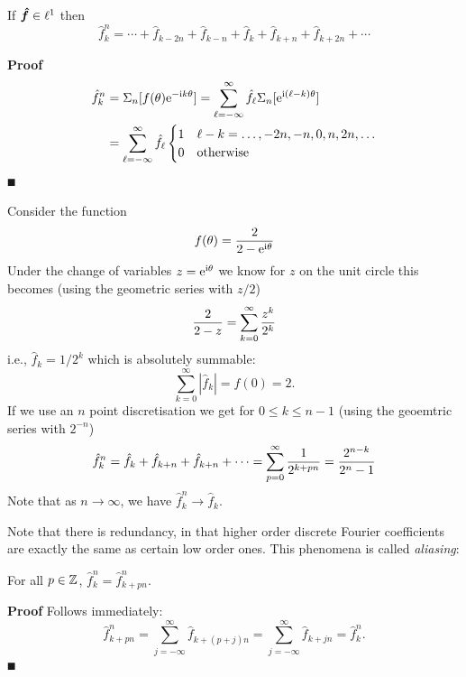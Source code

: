 \begin{theorem} If ${\mbox{\boldmath$\hat f$\unboldmath}} \in \ell^1$ then
\[
\hat f_k^n = \ensuremath{\cdots} + \hat f_{k-2n} + \hat f_{k-n} + \hat f_k + \hat f_{k+n} + \hat f_{k+2n} + \ensuremath{\cdots}
\]
\end{theorem}
\textbf{Proof}
\begin{align*}
\hat f_k^n &= \Sigma_n[f(\theta) {\rm e}^{-{\rm i} k \theta}] = \sum_{\ell=-\infty}^\infty \hat f_\ell \Sigma_n[{\rm e}^{{\rm i} (\ell-k) \theta}] \\
&= \sum_{\ell=-\infty}^\infty \hat f_\ell \begin{cases} 1 & \ell-k = \ldots,-2n,-n,0,n,2n,\ldots  \cr
0 & \hbox{otherwise}
\end{cases}
\end{align*}
\ensuremath{\QED}

\begin{example} Consider the function
\[
f(\theta) = {2 \over 2 - {\rm e}^{{\rm i} \theta}}
\]
Under the change of variables $z = {\rm e}^{{\rm i} \theta}$ we know for $z$ on the unit circle this becomes (using the geometric series with $z/2$)
\[
{2 \over 2-z} = \ensuremath{\sum}_{k=0}^\ensuremath{\infty} {z^k \over 2^k}
\]
i.e., $\hat f_k = 1/2^k$ which is absolutely summable:
\[
\ensuremath{\sum}_{k=0}^\ensuremath{\infty} |\hat f_k| = f(0) = 2.
\]
If we use an $n$ point discretisation we get for $0 \ensuremath{\leq} k \ensuremath{\leq} n-1$ (using the geoemtric series with $2^{-n}$)
\[
\hat f_k^n = \hat f_k + \hat f_{k+n} + \hat f_{k+n} + \ensuremath{\cdots} = \ensuremath{\sum}_{p=0}^\ensuremath{\infty} {1 \over 2^{k+pn}} = {2^{n-k} \over 2^n - 1}
\]
Note that as $n \rightarrow \ensuremath{\infty}$, we have $\hat f_k^n \rightarrow \hat f_k$. \end{example}

Note that there is redundancy, in that higher order discrete Fourier coefficients are exactly the same as certain low order ones. This phenomena is called \emph{aliasing}:

\begin{corollary}[aliasing] For all $p \in {\mathbb Z}$, $\hat f_k^n = \hat f_{k+pn}^n$.

\end{corollary}
\textbf{Proof} Follows immediately:
\[
\hat f_{k+pn}^n = \sum_{j=-\ensuremath{\infty}}^\ensuremath{\infty} \hat f_{k+(p+j)n}= \sum_{j=-\ensuremath{\infty}}^\ensuremath{\infty} \hat f_{k+j n} = \hat f_k^n.
\]
\ensuremath{\QED}


